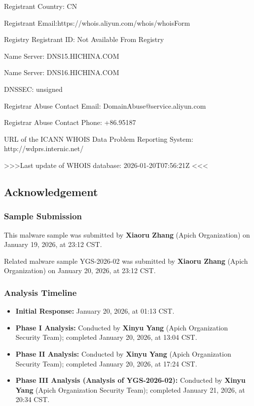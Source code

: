 \documentclass[
]{article}
\newenvironment{Shaded}{}{}
\newcommand{\NormalTok}[1]{#1}
\begin{document}
\begin{Shaded}
\begin{Highlighting}[]
\NormalTok{Registrant Country: CN}

\NormalTok{Registrant Email:https://whois.aliyun.com/whois/whoisForm}

\NormalTok{Registry Registrant ID: Not Available From Registry}

\NormalTok{Name Server: DNS15.HICHINA.COM}

\NormalTok{Name Server: DNS16.HICHINA.COM}

\NormalTok{DNSSEC: unsigned}

\NormalTok{Registrar Abuse Contact Email: DomainAbuse@service.aliyun.com}

\NormalTok{Registrar Abuse Contact Phone: +86.95187}

\NormalTok{URL of the ICANN WHOIS Data Problem Reporting System: http://wdprs.internic.net/}

\NormalTok{\textgreater{}\textgreater{}\textgreater{}Last update of WHOIS database: 2026{-}01{-}20T07:56:21Z \textless{}\textless{}\textless{}}
\end{Highlighting}
\end{Shaded}

\subsection{Acknowledgement}\label{acknowledgement}

\subsubsection{\texorpdfstring{\textbf{Sample
Submission}}{Sample Submission}}\label{sample-submission}

This malware sample was submitted by \textbf{Xiaoru Zhang} (Apich
Organization) on January 19, 2026, at 23:12 CST.

Related malware sample YGS-2026-02 was submitted by \textbf{Xiaoru
Zhang} (Apich Organization) on January 20, 2026, at 23:12 CST.

\subsubsection{\texorpdfstring{\textbf{Analysis
Timeline}}{Analysis Timeline}}\label{analysis-timeline}

\begin{itemize}
\item
  \textbf{Initial Response:} January 20, 2026, at 01:13 CST.
\item
  \textbf{Phase I Analysis:} Conducted by \textbf{Xinyu Yang} (Apich
  Organization Security Team); completed January 20, 2026, at 13:04 CST.
\item
  \textbf{Phase II Analysis:} Conducted by \textbf{Xinyu Yang} (Apich
  Organization Security Team); completed January 20, 2026, at 17:24 CST.
\item
  \textbf{Phase III Analysis (Analysis of YGS-2026-02):} Conducted by
  \textbf{Xinyu Yang} (Apich Organization Security Team); completed
  January 21, 2026, at 20:34 CST.
\end{itemize}
\end{document}
